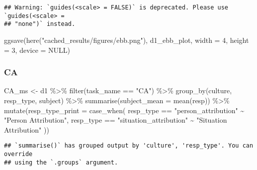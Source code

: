 \documentclass[
]{article}
\newenvironment{Shaded}{\begin{snugshade}}{\end{snugshade}}
\newcommand{\AttributeTok}[1]{\textcolor[rgb]{0.77,0.63,0.00}{#1}}
\newcommand{\ConstantTok}[1]{\textcolor[rgb]{0.00,0.00,0.00}{#1}}
\newcommand{\DecValTok}[1]{\textcolor[rgb]{0.00,0.00,0.81}{#1}}
\newcommand{\FunctionTok}[1]{\textcolor[rgb]{0.00,0.00,0.00}{#1}}
\newcommand{\NormalTok}[1]{#1}
\newcommand{\OtherTok}[1]{\textcolor[rgb]{0.56,0.35,0.01}{#1}}
\newcommand{\SpecialCharTok}[1]{\textcolor[rgb]{0.00,0.00,0.00}{#1}}
\newcommand{\StringTok}[1]{\textcolor[rgb]{0.31,0.60,0.02}{#1}}
\begin{document}
\begin{verbatim}
## Warning: `guides(<scale> = FALSE)` is deprecated. Please use `guides(<scale> =
## "none")` instead.
\end{verbatim}

\begin{Shaded}
\begin{Highlighting}[]
\FunctionTok{ggsave}\NormalTok{(}\FunctionTok{here}\NormalTok{(}\StringTok{"cached\_results/figures/ebb.png"}\NormalTok{), d1\_ebb\_plot, }
       \AttributeTok{width =} \DecValTok{4}\NormalTok{, }\AttributeTok{height =} \DecValTok{3}\NormalTok{, }\AttributeTok{device =} \ConstantTok{NULL}\NormalTok{)}
\end{Highlighting}
\end{Shaded}

\hypertarget{ca}{%
\subsubsection{CA}\label{ca}}

\begin{Shaded}
\begin{Highlighting}[]
\NormalTok{CA\_ms }\OtherTok{\textless{}{-}}\NormalTok{ d1 }\SpecialCharTok{\%\textgreater{}\%}
  \FunctionTok{filter}\NormalTok{(task\_name }\SpecialCharTok{==} \StringTok{"CA"}\NormalTok{) }\SpecialCharTok{\%\textgreater{}\%} 
  \FunctionTok{group\_by}\NormalTok{(culture, resp\_type, subject) }\SpecialCharTok{\%\textgreater{}\%}
  \FunctionTok{summarise}\NormalTok{(}\AttributeTok{subject\_mean =} \FunctionTok{mean}\NormalTok{(resp)) }\SpecialCharTok{\%\textgreater{}\%} 
  \FunctionTok{mutate}\NormalTok{(}\AttributeTok{resp\_type\_print =} \FunctionTok{case\_when}\NormalTok{(}
\NormalTok{    resp\_type }\SpecialCharTok{==} \StringTok{"person\_attribution"} \SpecialCharTok{\textasciitilde{}} \StringTok{"Person Attribution"}\NormalTok{, }
\NormalTok{    resp\_type }\SpecialCharTok{==} \StringTok{"situation\_attribution"} \SpecialCharTok{\textasciitilde{}} \StringTok{"Situation Attribution"}
\NormalTok{  ))}
\end{Highlighting}
\end{Shaded}

\begin{verbatim}
## `summarise()` has grouped output by 'culture', 'resp_type'. You can override
## using the `.groups` argument.
\end{verbatim}
\end{document}
